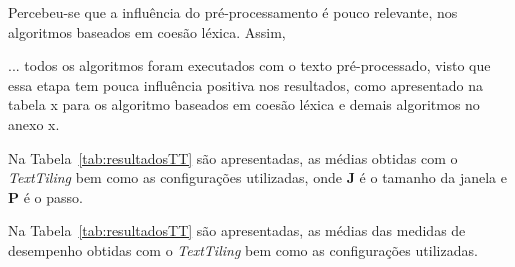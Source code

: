 Percebeu-se que a influência do pré-processamento é pouco relevante, nos algoritmos baseados em coesão léxica. Assim, 


... todos os algoritmos foram executados com o texto pré-processado, visto que essa etapa tem pouca influência positiva nos resultados, 
como apresentado na tabela x para os algoritmo baseados em coesão léxica e demais algoritmos no anexo x.





















































  Na Tabela~\ref{tab:resultadosTT} são apresentadas, as médias obtidas com o \textit{TextTiling} bem como as configurações utilizadas, onde \textbf{J} é o tamanho da janela e \textbf{P} é o passo.



Na Tabela~\ref{tab:resultadosTT} são apresentadas, as médias das medidas de desempenho obtidas com o \textit{TextTiling} bem como as configurações utilizadas.

















































